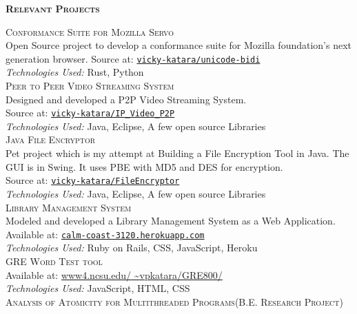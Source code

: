 \documentclass[letterpaper,12pt,final]{memoir}
\newcommand{\SmallSep}{\vspace{0.5em}}
\newcommand{\CVSection}[1]
	{\Large\textbf{\textsc{{#1}}}\par
	\SmallSep\normalsize\normalfont}
\newcommand{\CVItem}[1]
	{\textsc{\color{Black} #1}}
\begin{document}
\CVSection{Relevant Projects}
\CVItem{Conformance Suite for Mozilla Servo}\\
{\footnotesize Open Source project to develop a conformance suite for Mozilla foundation's next generation browser. Source at: \color{Black} \href{https://github.com/vicky-katara/unicode-bidi}{\space\space\texttt{vicky-katara/unicode-bidi}} \\\color{Black}
	\emph{Technologies Used:} Rust, Python}%
\SmallSep\\
\CVItem{Peer to Peer Video Streaming System}\\
{\footnotesize Designed and developed a P2P Video Streaming System. \\Source at: \color{Black} \href{https://github.com/vicky-katara/IP_Video_P2P.git}{\space\space\texttt{vicky-katara/IP\_Video\_P2P}} \\\color{Black}
	\emph{Technologies Used:} Java, Eclipse, A few open source Libraries}%
\SmallSep\\
\CVItem{Java File Encryptor}\\
{\footnotesize Pet project which is my attempt at Building a File Encryption Tool in Java. The GUI is in Swing. It uses PBE with MD5 and DES for encryption. \\Source at: \color{Black} \href{https://github.com/vicky-katara/FileEncryptor.git}{\space\space\texttt{vicky-katara/FileEncryptor}} \\\color{Black}
	\emph{Technologies Used:} Java, Eclipse, A few open source Libraries}%
\SmallSep\\
\CVItem{Library Management System}\\
{\footnotesize Modeled and developed a Library Management System as a Web Application. Available at: \color{Black} \href{https://calm-coast-3120.herokuapp.com/}{\space\space\texttt{calm-coast-3120.herokuapp.com}} \\\color{Black}
	\emph{Technologies Used:} Ruby on Rails, CSS, JavaScript, Heroku}%
\SmallSep\\
\CVItem{GRE Word Test tool}\\
{\footnotesize Available at: \color{Black} \href{http://www4.ncsu.edu/~vpkatara/GRE800/}{\space\space\url{www4.ncsu.edu/ ~vpkatara/GRE800/}} \\\color{Black}
	\emph{Technologies Used:} JavaScript, HTML, CSS}%
\SmallSep\\
\CVItem{Analysis of Atomicity for Multithreaded Programs\space(B.E. Research Project)}\\
\end{document}
